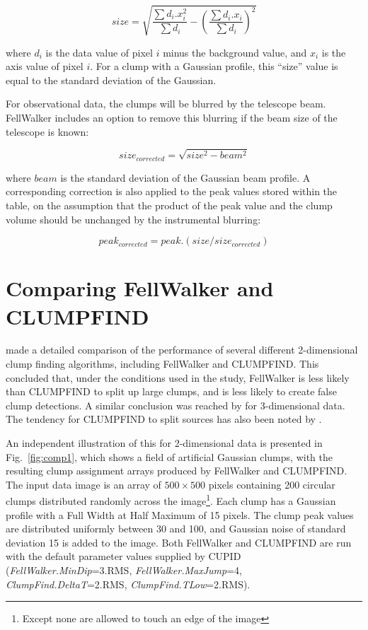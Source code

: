 \documentclass[final,authoryear,5p,times,twocolumn]{elsarticle}
\begin{document}
\[ size = \sqrt{ \frac{ \sum d_{i}.x_{i}^{2} }{ \sum d_{i} } -
\left( \frac{\sum d_{i}.x_{i} }{\sum d_{i}}  \right)^2 } \]

where $d_{i}$ is the data value of pixel $i$ minus the background value,
and $x_{i}$ is the axis value of pixel $i$. For a clump with a Gaussian
profile, this ``size'' value is equal to the standard deviation of the
Gaussian.

For observational data, the clumps will be blurred by the telescope beam.
FellWalker includes an option to remove this blurring if the beam size of
the telescope is known:

\[ size_{corrected} = \sqrt{ size^{2} - beam^{2} } \]

where $beam$ is the standard deviation of the Gaussian beam profile. A
corresponding correction is also applied to the peak values stored within
the table, on the assumption that the product of the peak value and the
clump volume should be unchanged by the instrumental blurring:

\[ peak_{corrected} = peak.(size/size_{corrected}) \]




\section{Comparing FellWalker and CLUMPFIND}
\label{sec:compare}
\cite{2010Watson} made a detailed comparison of the performance of several
different 2-dimensional clump finding algorithms, including FellWalker and CLUMPFIND.
This concluded that, under the conditions used in the study, FellWalker
is less likely than CLUMPFIND to split up large clumps, and is less
likely to create false clump detections. A similar conclusion was reached
by \cite{2014Christie} for 3-dimensional data. The tendency for CLUMPFIND
to split sources has also been noted by \cite{2006Enoch}.

An independent illustration of this for 2-dimensional data is presented in
Fig.~\ref{fig:comp1}, which shows a field of artificial Gaussian clumps,
with the resulting clump assignment arrays produced by FellWalker and
CLUMPFIND. The input data image is an array of $500\times500$ pixels
containing 200 circular clumps distributed randomly across the
image\footnote{Except none are allowed to touch an edge of the image}.
Each clump has a Gaussian profile with a Full Width at Half Maximum of 15
pixels. The clump peak values are distributed uniformly between 30 and
100, and Gaussian noise of standard deviation 15 is added to the image.
Both FellWalker and CLUMPFIND are run with the default parameter values
supplied by CUPID (\emph{FellWalker.MinDip}=3.RMS,
\emph{FellWalker.MaxJump}=4, \emph{ClumpFind.DeltaT}=2.RMS,
\emph{ClumpFind.TLow}=2.RMS).
\end{document}
